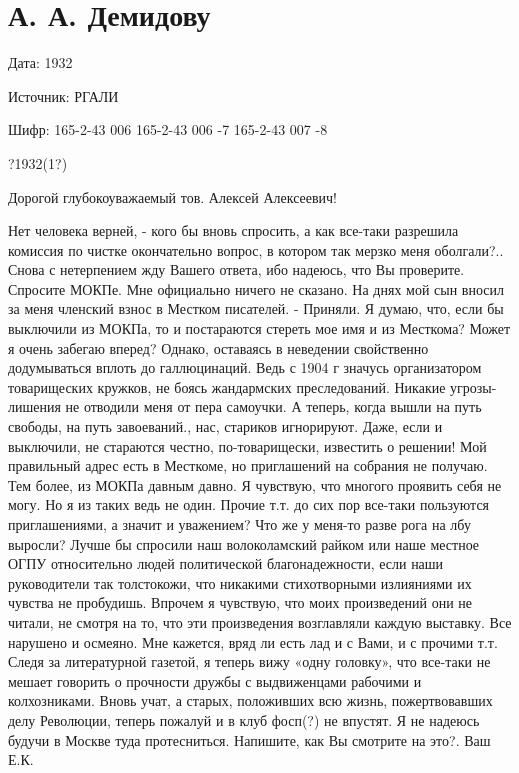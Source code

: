 \documentclass[]{memoir}
\begin{document}
\section{А. А. Демидову}

Дата: 1932

Источник: РГАЛИ


Шифр:   165-2-43 006
        165-2-43 006 -7
        165-2-43 007 -8

?1932(1?)

                                              Дорогой глубокоуважаемый тов. Алексей Алексеевич!

Нет человека верней, - кого бы вновь спросить, а как все-таки разрешила комиссия по чистке окончательно вопрос, в котором так мерзко меня оболгали?.. Снова с нетерпением жду Вашего ответа, ибо надеюсь, что Вы проверите. Спросите МОКПе. Мне официально ничего не сказано. На днях мой сын вносил за меня членский взнос в Местком писателей. - Приняли.
Я думаю, что, если бы выключили из МОКПа, то и постараются стереть мое имя и из Месткома? Может я очень забегаю вперед? Однако, оставаясь в неведении свойственно додумываться вплоть до галлюцинаций. Ведь с 1904 г значусь организатором товарищеских кружков, не боясь жандармских преследований. Никакие угрозы-лишения не отводили меня от пера самоучки. А теперь, когда вышли на путь свободы, на путь завоеваний., нас, стариков игнорируют. Даже, если и выключили, не стараются честно, по-товарищески, известить о решении!
Мой правильный адрес есть в Месткоме, но приглашений на собрания не получаю. Тем более, из МОКПа давным давно. Я чувствую, что многого проявить себя не могу. Но я из таких ведь не один. Прочие т.т. до сих пор все-таки пользуются приглашениями, а значит и уважением? Что же у меня-то разве рога на лбу выросли? Лучше бы спросили наш волоколамский райком или наше местное ОГПУ относительно людей политической благонадежности, если наши руководители так толстокожи, что никакими стихотворными излияниями их чувства не пробудишь. Впрочем я чувствую, что моих произведений они не читали, не смотря на то, что эти произведения возглавляли каждую выставку. Все нарушено и осмеяно. Мне кажется, вряд ли есть лад и с Вами, и с прочими т.т. Следя за литературной газетой, я теперь вижу «одну головку», что все-таки не мешает говорить о прочности дружбы с выдвиженцами рабочими и колхозниками. Вновь учат, а старых, положивших всю жизнь,  пожертвовавших делу Революции, теперь пожалуй и в клуб фосп(?) не впустят. Я не надеюсь будучи в Москве туда протесниться. Напишите, как Вы смотрите на это?. Ваш Е.К.
\end{document}
